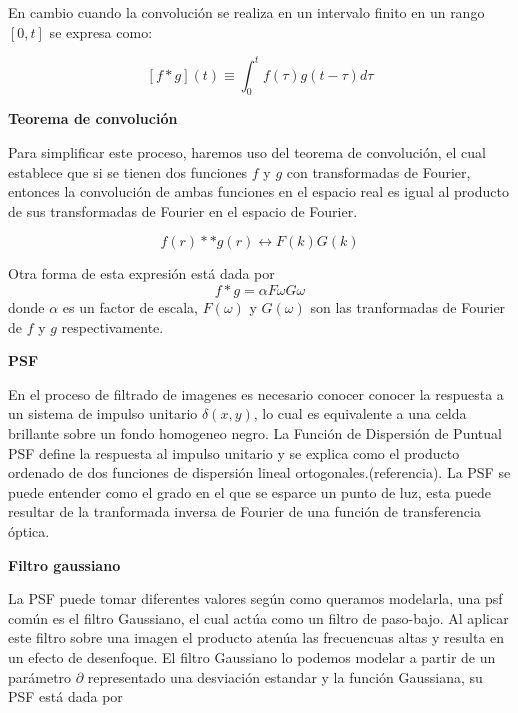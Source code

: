 \documentclass[eng]{ajceam-class}
\begin{document}
En cambio cuando la convolución se realiza en un intervalo finito en un rango $[0,t]$ se expresa como:

\begin{equation} \label{ec-2}
 [f*g](t) \equiv \int_{0}^{t} f(\tau)g(t-\tau) d\tau
\end{equation}

\textbf{Teorema de convolución}

 Para simplificar este proceso, haremos uso del teorema de convolución, el cual establece que si se tienen dos funciones $f$ y $g$ con transformadas de Fourier, entonces la convolución de ambas funciones en el espacio real es igual al producto de sus transformadas de Fourier en el espacio de Fourier. 

\begin{equation} \label{ec-3}
    f(r) \ast \ast g(r) \longleftrightarrow F(k)G(k)
\end{equation}

Otra forma de esta expresión está dada por 
\begin{equation}\label{ec-4}
    f \ast g = \alpha F\omega G\omega
\end{equation}
donde $\alpha$ es un factor de escala, $F(\omega)$ y $G(\omega)$ son las tranformadas de Fourier de $f$ y $g$ respectivamente.\cite{Jauregui2014}\cite{Blackledge2005} 

\textbf{PSF} 

En el proceso de filtrado de imagenes es necesario conocer conocer la respuesta a un sistema de impulso unitario $\delta(x,y)$, lo cual es equivalente a una celda brillante sobre un fondo homogeneo negro. La Función de Dispersión de Puntual PSF define la respuesta al impulso unitario y se explica como el producto ordenado de dos funciones de dispersión lineal ortogonales.(referencia). La PSF se puede entender como el grado en el que se esparce un punto de luz, esta puede resultar de la tranformada inversa de Fourier de una función de transferencia óptica. \cite{article}


\textbf{Filtro gaussiano} 

La PSF puede tomar diferentes valores según como queramos modelarla, una psf común es el filtro Gaussiano, el cual actúa como un filtro de paso-bajo. Al aplicar este filtro sobre una imagen el producto atenúa las frecuencuas altas y resulta en un efecto de desenfoque. El filtro Gaussiano lo podemos modelar a partir de un parámetro $\partial$ representado una desviación estandar y la función Gaussiana, su PSF está dada por 
\end{document}
